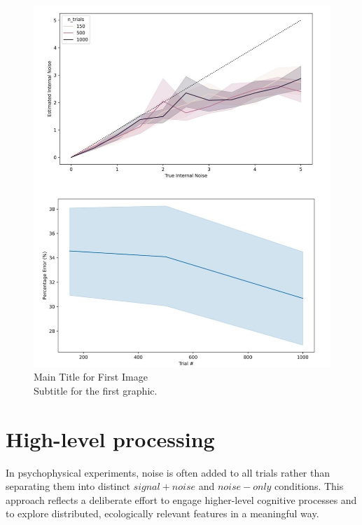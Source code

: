 \begin{figure}[ht!]
    \centering
    \includegraphics[width=14cm]{MainLayout/Images/internal_noise.jpg}
    \caption{Main Title for First Image \\ \small Subtitle for the first graphic.}
    \label{fig:internal_noise}
\end{figure}
 
\section{High-level processing}


In psychophysical experiments, noise is often added to all trials rather than separating them into distinct $signal+noise$ and $noise-only$ conditions. This approach reflects a deliberate effort to engage higher-level cognitive processes and to explore distributed, ecologically relevant features in a meaningful way.

